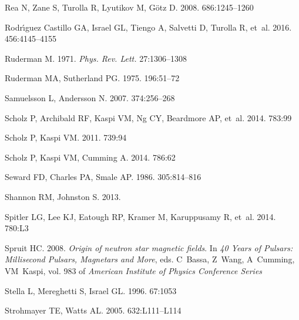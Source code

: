 \documentclass[letterpaper]{ar-1col}
\begin{document}
\begin{thebibliography}{}
{Rea} N, {Zane} S, {Turolla} R, {Lyutikov} M, {G{\"o}tz} D. 2008.
\textit{\apj} 686:1245--1260

{Rodr{\'{\i}}guez Castillo} GA, {Israel} GL, {Tiengo} A, {Salvetti} D,
  {Turolla} R, et~al. 2016.
\textit{\mnras} 456:4145--4155

Ruderman M. 1971.
\textit{Phys. Rev. Lett.} 27:1306--1308

Ruderman MA, Sutherland PG. 1975.
\textit{\apj} 196:51--72

{Samuelsson} L, {Andersson} N. 2007.
\textit{\mnras} 374:256--268

{Scholz} P, {Archibald} RF, {Kaspi} VM, {Ng} CY, {Beardmore} AP, et~al. 2014.
\textit{\apj} 783:99

{Scholz} P, {Kaspi} VM. 2011.
\textit{\apj} 739:94

{Scholz} P, {Kaspi} VM, {Cumming} A. 2014.
\textit{\apj} 786:62

Seward FD, Charles PA, Smale AP. 1986.
\textit{\apj} 305:814--816

{Shannon} RM, {Johnston} S. 2013.
\textit{\mnras}

{Spitler} LG, {Lee} KJ, {Eatough} RP, {Kramer} M, {Karuppusamy} R, et~al. 2014.
\textit{\apjl} 780:L3

{Spruit} HC. 2008.
\textit{{Origin of neutron star magnetic fields}}. In \textit{40 Years of
  Pulsars: Millisecond Pulsars, Magnetars and More}, eds. C~{Bassa}, Z~{Wang},
  A~{Cumming}, VM~{Kaspi}, vol. 983 of \textit{American Institute of Physics
  Conference Series}

{Stella} L, {Mereghetti} S, {Israel} GL. 1996.
\textit{\memsai} 67:1053

{Strohmayer} TE, {Watts} AL. 2005.
\textit{\apjl} 632:L111--L114


\end{thebibliography}
\end{document}
